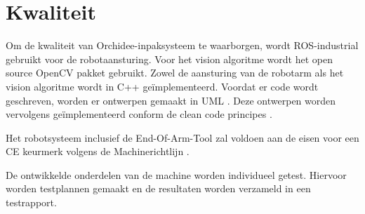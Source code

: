 
\section{Kwaliteit}

Om de kwaliteit van Orchidee-inpaksysteem te waarborgen, wordt ROS-industrial gebruikt voor de robotaansturing.
Voor het vision algoritme wordt het open source OpenCV pakket gebruikt.
Zowel de aansturing van de robotarm als het vision algoritme wordt in C++ geïmplementeerd.
Voordat er code wordt geschreven, worden er ontwerpen gemaakt in UML \cite{UML}.
Deze ontwerpen worden vervolgens geïmplementeerd conform de clean code principes \cite{CLEAN_CODE}.

Het robotsysteem inclusief de End-Of-Arm-Tool zal voldoen aan de eisen voor een CE keurmerk volgens de Machinerichtlijn \cite{Machinerichtlijn}.

De ontwikkelde onderdelen van de machine worden individueel getest. Hiervoor worden testplannen gemaakt en de resultaten worden verzameld in een testrapport.

\newpage

